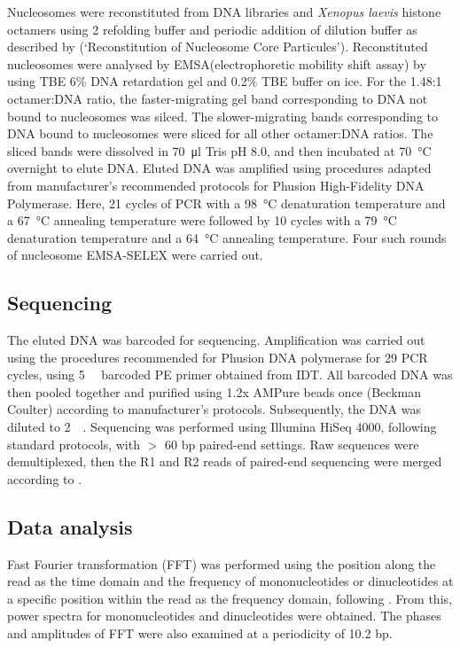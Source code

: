 \documentclass[parskip=full, numbers=noenddot]{scrbook}
\begin{document}
Nucleosomes were reconstituted from DNA libraries and \emph{Xenopus laevis} histone octamers using \SI{2}{\Molar}  refolding buffer and periodic addition of dilution buffer as described by \citet{dyer_reconstitution_2003} (`Reconstitution of Nucleosome Core Particules').  Reconstituted nucleosomes were analysed by EMSA(electrophoretic mobility shift assay) by using TBE 6\% DNA retardation gel and 0.2\% TBE buffer on ice.  For the 1.48:1 octamer:DNA ratio, the faster-migrating gel band corresponding to DNA not bound to nucleosomes was silced.  The slower-migrating bands corresponding to DNA bound to nucleosomes were sliced for all other octamer:DNA ratios.  The sliced bands were dissolved in \SI{70}{\micro\litre} Tris pH 8.0, and then incubated at \SI{70}{\celsius} overnight to elute DNA.  Eluted DNA was amplified using procedures adapted from manufacturer's recommended protocols for Phusion High-Fidelity DNA Polymerase.  Here, 21 cycles of PCR with a \SI{98}{\celsius} denaturation temperature and a \SI{67}{\celsius} annealing temperature were followed by 10 cycles with a \SI{79}{\celsius} denaturation temperature and a \SI{64}{\celsius} annealing temperature.  Four such rounds of nucleosome EMSA-SELEX were carried out.

\subsection{Sequencing}
\label{ssec:emsaselex_methods_seq}

The eluted DNA was barcoded for sequencing.  Amplification was carried out using the procedures recommended for Phusion DNA polymerase for 29 PCR cycles, using \SI{5}{\micro\Molar} barcoded PE primer obtained from IDT.  All barcoded DNA was then pooled together and purified using 1.2x AMPure beads once (Beckman Coulter) according to manufacturer's protocols.  Subsequently, the DNA was diluted to \SI{2}{\nano\Molar}.  Sequencing was performed using Illumina HiSeq 4000, following standard protocols, with $>$ 60 bp paired-end settings.  Raw sequences were demultiplexed, then the R1 and R2 reads of paired-end sequencing were merged according to \citet{zhu_interaction_2018}.

\subsection{Data analysis}
\label{ssec:emsaselex_methods_anal}

Fast Fourier transformation (FFT) was performed using the position along the read as the time domain and the frequency of mononucleotides or dinucleotides at a specific position within the read as the frequency domain, following \citet{zhu_interaction_2018}.  From this, power spectra for mononucleotides and dinucleotides were obtained.  The phases and amplitudes of FFT were also examined at a periodicity of 10.2 bp.
\end{document}
